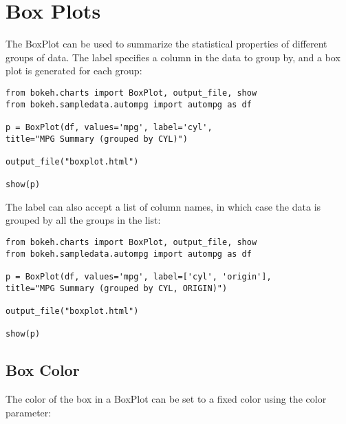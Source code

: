 \documentclass[a4paper,12pt]{article}
\begin{document}
\section{Box Plots}
The BoxPlot can be used to summarize the statistical properties of different groups of data. The label specifies a column in the data to group by, and a box plot is generated for each group:
\begin{framed}
	\begin{verbatim}
from bokeh.charts import BoxPlot, output_file, show
from bokeh.sampledata.autompg import autompg as df

p = BoxPlot(df, values='mpg', label='cyl',
title="MPG Summary (grouped by CYL)")

output_file("boxplot.html")

show(p)
\end{verbatim}
\end{framed}
The label can also accept a list of column names, in which case the data is grouped by all the groups in the list:
\begin{framed}
	\begin{verbatim}
from bokeh.charts import BoxPlot, output_file, show
from bokeh.sampledata.autompg import autompg as df

p = BoxPlot(df, values='mpg', label=['cyl', 'origin'],
title="MPG Summary (grouped by CYL, ORIGIN)")

output_file("boxplot.html")

show(p)
\end{verbatim}
\end{framed}
\subsection{Box Color}
The color of the box in a BoxPlot can be set to a fixed color using the color parameter:
\end{document}
